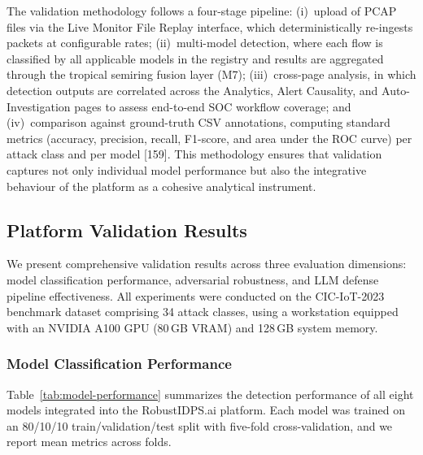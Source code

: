 \documentclass[12pt,a4paper]{article}
\begin{document}
The validation methodology follows a four-stage pipeline: (i)~upload
of PCAP files via the Live Monitor File Replay interface, which
deterministically re-ingests packets at configurable rates;
(ii)~multi-model detection, where each flow is classified by all
applicable models in the registry and results are aggregated through
the tropical semiring fusion layer (M7); (iii)~cross-page analysis,
in which detection outputs are correlated across the Analytics,
Alert Causality, and Auto-Investigation pages to assess end-to-end
SOC workflow coverage; and (iv)~comparison against ground-truth CSV
annotations, computing standard metrics (accuracy, precision, recall,
F1-score, and area under the ROC curve) per attack class and per
model [159].  This methodology ensures that validation captures not
only individual model performance but also the integrative behaviour
of the platform as a cohesive analytical instrument.



\subsection{Platform Validation Results}
\label{subsec:platform-validation-results}

We present comprehensive validation results across three evaluation dimensions:
model classification performance, adversarial robustness, and LLM defense
pipeline effectiveness. All experiments were conducted on the CIC-IoT-2023
benchmark dataset comprising 34 attack classes, using a workstation equipped
with an NVIDIA A100 GPU (80\,GB VRAM) and 128\,GB system memory.

\subsubsection{Model Classification Performance}

Table~\ref{tab:model-performance} summarizes the detection performance of
all eight models integrated into the RobustIDPS.ai platform. Each model was
trained on an 80/10/10 train/validation/test split with five-fold
cross-validation, and we report mean metrics across folds.
\end{document}
